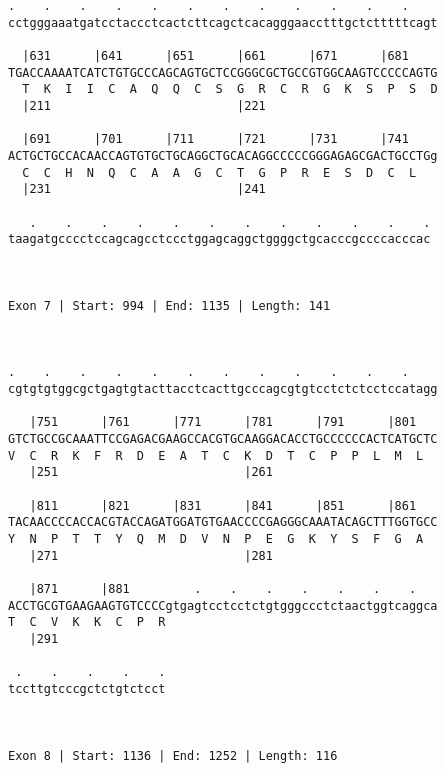 \documentclass{article}
\begin{document}
{\begin{Verbatim}
.    .    .    .    .    .    .    .    .    .    .    .    
cctgggaaatgatcctaccctcactcttcagctcacagggaacctttgctctttttcagt
                                                            
  |631      |641      |651      |661      |671      |681    
TGACCAAAATCATCTGTGCCCAGCAGTGCTCCGGGCGCTGCCGTGGCAAGTCCCCCAGTG
  T  K  I  I  C  A  Q  Q  C  S  G  R  C  R  G  K  S  P  S  D
  |211                          |221                        
  
  |691      |701      |711      |721      |731      |741    
ACTGCTGCCACAACCAGTGTGCTGCAGGCTGCACAGGCCCCCGGGAGAGCGACTGCCTGg
  C  C  H  N  Q  C  A  A  G  C  T  G  P  R  E  S  D  C  L   
  |231                          |241                        
  
   .    .    .    .    .    .    .    .    .    .    .    .
taagatgcccctccagcagcctccctggagcaggctggggctgcacccgccccacccac
                                                           
                                                           
 
Exon 7 | Start: 994 | End: 1135 | Length: 141



.    .    .    .    .    .    .    .    .    .    .    .    
cgtgtgtggcgctgagtgtacttacctcacttgcccagcgtgtcctctctcctccatagg
                                                            
   |751      |761      |771      |781      |791      |801   
GTCTGCCGCAAATTCCGAGACGAAGCCACGTGCAAGGACACCTGCCCCCCACTCATGCTC
V  C  R  K  F  R  D  E  A  T  C  K  D  T  C  P  P  L  M  L  
   |251                          |261                       
  
   |811      |821      |831      |841      |851      |861   
TACAACCCCACCACGTACCAGATGGATGTGAACCCCGAGGGCAAATACAGCTTTGGTGCC
Y  N  P  T  T  Y  Q  M  D  V  N  P  E  G  K  Y  S  F  G  A  
   |271                          |281                       
  
   |871      |881         .    .    .    .    .    .    .   
ACCTGCGTGAAGAAGTGTCCCCgtgagtcctcctctgtgggccctctaactggtcaggca
T  C  V  K  K  C  P  R                                      
   |291                                                     
  
 .    .    .    .    .
tccttgtcccgctctgtctcct
                      
                      
 
Exon 8 | Start: 1136 | End: 1252 | Length: 116




\end{Verbatim}}
\end{document}

